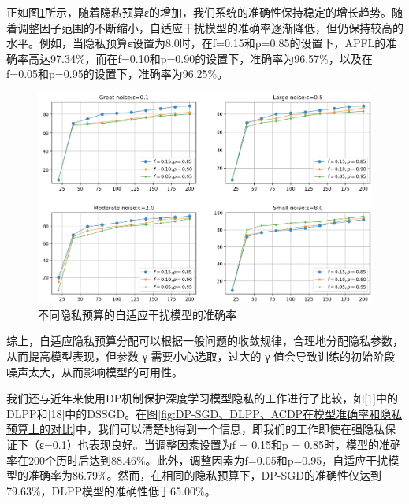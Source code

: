 正如图\ref{fig:不同隐私预算的自适应干扰机制在MINIST数据集上的准确率}所示，随着隐私预算ε的增加，我们系统的准确性保持稳定的增长趋势。随着调整因子范围的不断缩小，自适应干扰模型的准确率逐渐降低，但仍保持较高的水平。例如，当隐私预算ε设置为8.0时，在f=0.15和p=0.85的设置下，APFL的准确率高达97.34$\%$，而在f=0.10和p=0.90的设置下，准确率为96.57$\%$，以及在f=0.05和p=0.95的设置下，准确率为96.25$\%$。

\begin{figure}[!hbt]
\centering
  	\includegraphics[scale=0.4]{fig2/C5/自适应干扰实验}%
	\caption{不同隐私预算的自适应干扰模型的准确率}
  	\label{fig:不同隐私预算的自适应干扰机制在MINIST数据集上的准确率} 
\end{figure}

综上，自适应隐私预算分配可以根据一般问题的收敛规律，合理地分配隐私参数，从而提高模型表现，但参数 γ 需要小心选取，过大的 γ 值会导致训练的初始阶段噪声太大，从而影响模型的可用性。

我们还与近年来使用DP机制保护深度学习模型隐私的工作进行了比较，如[1]中的DLPP和[18]中的DSSGD。在图\ref{fig:DP-SGD、DLPP、ACDP在模型准确率和隐私预算上的对比}中，我们可以清楚地得到一个信息，即我们的工作即使在强隐私保证下（ε=0.1）也表现良好。当调整因素设置为f = 0.15和p = 0.85时，模型的准确率在200个历时后达到88.46$\%$。此外，调整因素为f=0.05和p=0.95，自适应干扰模型的准确率为86.79$\%$。然而，在相同的隐私预算下，DP-SGD的准确性仅达到79.63$\%$，DLPP模型的准确性低于65.00$\%$。

